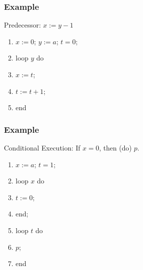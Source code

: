 \documentclass{beamer}
\theoremstyle{indentDefn} \newtheorem{defn}[]{Definition}
\begin{document}
\begin{frame}
	\frametitle{Example}

	Predecessor: $x:= y - 1$ 
	
	\vspace{0.5cm}

	\begin{enumerate}
		\item[] $x := 0$; $y := a$; $t = 0$;
		\item[] loop $y$ do 
		\item[] \hspace{0.5cm} $x := t$;
		\item[] \hspace{0.5cm} $t := t + 1$;
		\item[] end
	\end{enumerate}

	\vspace{5cm}


\end{frame}

\begin{frame}
	\frametitle{Example}

	Conditional Execution: If $x = 0$, then (do) $p$. 
	
	\vspace{0.5cm}

	\begin{enumerate}
		\item[] $x := a$; $t = 1$;
		\item[] loop $x$ do 
		\item[] \hspace{0.5cm} $t := 0$;
		\item[] end;
		\item[] loop $t$ do
		\item[] \hspace{0.5cm} $p$;
		\item[] end
	\end{enumerate}

	\vspace{5cm}

	
\end{frame}
\end{document}
